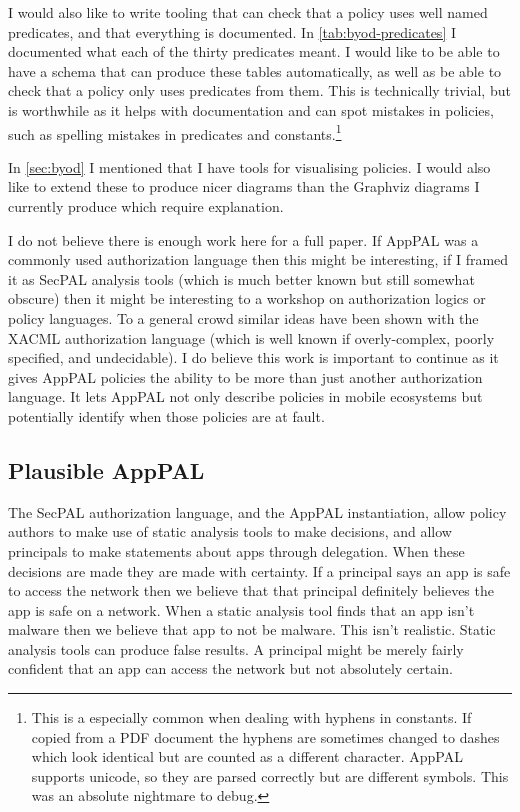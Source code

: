 \documentclass[a4paper]{scrartcl}
\begin{document}
I would also like to write tooling that can check that a policy uses well named
predicates, and that everything is documented.  In \autoref{tab:byod-predicates}
I documented what each of the thirty predicates meant.  I would like to be able
to have a schema that can produce these tables automatically, as well as be able to
check that a policy only uses predicates from them.  This is technically
trivial, but is worthwhile as it helps with documentation and can spot mistakes
in policies, such as spelling mistakes in predicates and constants.\footnote{This is a
  especially common when dealing with hyphens in constants.  If copied from a
  PDF document the hyphens are sometimes changed to dashes which look identical
  but are counted as a different character.  AppPAL supports unicode, so they
  are parsed correctly but are different symbols.  This was an absolute
  nightmare to debug.}

In \autoref{sec:byod} I mentioned that I have tools for visualising policies.  I
would also like to extend these to produce nicer diagrams than the Graphviz
diagrams I currently produce which require explanation.

I do not believe there is enough work here for a full paper.  If AppPAL was a
commonly used authorization language then this might be interesting, if I framed
it as SecPAL analysis tools (which is much better known but still somewhat
obscure) then it might be interesting to a workshop on authorization logics or
policy languages.   To a general crowd similar ideas have been shown with the
XACML authorization language (which is well known if overly-complex, poorly
specified, and undecidable).  I do believe this work is important to continue as
it gives AppPAL policies the ability to be more than just another authorization
language. It lets AppPAL not only describe policies in mobile ecosystems but
potentially identify when those policies are at fault.

\subsection{Plausible AppPAL}
\label{sec:plausible}

The SecPAL authorization language, and the AppPAL instantiation, allow policy
authors to make use of static analysis tools to make decisions, and allow
principals to make statements about apps through delegation. When these
decisions are made they are made with certainty. If a principal says an app is
safe to access the network then we believe that that principal definitely
believes the app is safe on a network. When a static analysis tool finds that an
app isn't malware then we believe that app to not be malware. This isn't
realistic. Static analysis tools can produce false results. A principal might be
merely fairly confident that an app can access the network but not absolutely
certain.
\end{document}
